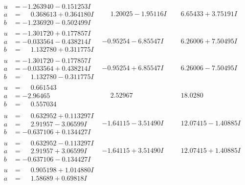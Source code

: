 \documentclass[1p]{elsarticle_modified}
\theoremstyle{definition}
\begin{document}
$$\begin{array}{c|c|c}
\begin{aligned}
u &= -1.263940 - 0.151253 I \\
a &= \phantom{-}0.368613 + 0.364180 I \\
b &= -1.236920 - 0.502499 I\end{aligned}
 & \phantom{-}1.20025 - 1.95116 I & \phantom{-}6.65433 + 3.75191 I \\ \hline\begin{aligned}
u &= -1.301720 + 0.177857 I \\
a &= -0.033564 - 0.438214 I \\
b &= \phantom{-}1.132780 + 0.311775 I\end{aligned}
 & -0.95254 - 6.85547 I & \phantom{-}6.26006 + 7.50495 I \\ \hline\begin{aligned}
u &= -1.301720 - 0.177857 I \\
a &= -0.033564 + 0.438214 I \\
b &= \phantom{-}1.132780 - 0.311775 I\end{aligned}
 & -0.95254 + 6.85547 I & \phantom{-}6.26006 - 7.50495 I \\ \hline\begin{aligned}
u &= \phantom{-}0.661543\phantom{ +0.000000I} \\
a &= -2.96465\phantom{ +0.000000I} \\
b &= \phantom{-}0.557034\phantom{ +0.000000I}\end{aligned}
 & \phantom{-}2.52967\phantom{ +0.000000I} & \phantom{-}18.0280\phantom{ +0.000000I} \\ \hline\begin{aligned}
u &= \phantom{-}0.632952 + 0.113297 I \\
a &= \phantom{-}2.91957 - 3.06599 I \\
b &= -0.637106 + 0.134427 I\end{aligned}
 & -1.64115 - 3.51490 I & \phantom{-}12.07415 - 1.40885 I \\ \hline\begin{aligned}
u &= \phantom{-}0.632952 - 0.113297 I \\
a &= \phantom{-}2.91957 + 3.06599 I \\
b &= -0.637106 - 0.134427 I\end{aligned}
 & -1.64115 + 3.51490 I & \phantom{-}12.07415 + 1.40885 I \\ \hline\begin{aligned}
u &= \phantom{-}0.905198 + 1.014880 I \\
a &= \phantom{-}1.58689 + 0.69818 I \\

\end{aligned}
\end{array}$$
\end{document}
